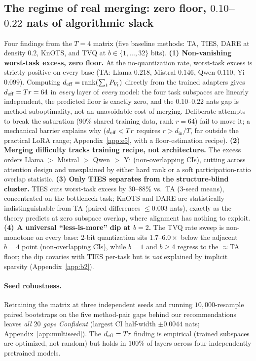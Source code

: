 \subsection{The regime of real merging: zero floor, $0.10$--$0.22$ nats
of algorithmic slack}
\label{subsec:exp-lora}\label{subsec:exp-multiseed}

Four findings from the $T = 4$ matrix (five baseline methods: TA, TIES,
DARE at density $0.2$, KnOTS, and TVQ at $b \in \{1,\dots,32\}$ bits).
\textbf{(1) Non-vanishing worst-task excess, zero floor.} At the
no-quantization rate, worst-task excess is strictly positive on every
base (TA: Llama $0.218$, Mistral $0.146$, Qwen $0.110$, Yi $0.099$).
Computing $d_{\mathrm{eff}} = \operatorname{rank}(\sum_t P_{V_t})$
directly from the trained adapters gives $d_{\mathrm{eff}} = Tr = 64$ in
\emph{every} layer of \emph{every} model: the four task subspaces are
linearly independent, the predicted floor is exactly zero, and the
$0.10$--$0.22$ nats gap is method suboptimality, not an unavoidable
cost of merging. Deliberate attempts to break the saturation ($90\%$
shared training data, rank $r = 64$) fail to move it; a mechanical
barrier explains why ($d_{\mathrm{eff}} < Tr$ requires $r > d_{\mathrm{in}}/T$,
far outside the practical LoRA range; Appendix~\ref{app:e5}, with a
floor-estimation recipe). \textbf{(2) Merging difficulty tracks
training recipe, not architecture.} The excess orders Llama $>$
Mistral $>$ Qwen $>$ Yi (non-overlapping CIs), cutting across
attention design and unexplained by either hard rank or a soft
participation-ratio overlap statistic. \textbf{(3) Only TIES
separates from the structure-blind cluster.} TIES cuts worst-task
excess by $30$--$88\%$ vs.\ TA ($3$-seed means), concentrated on the
bottleneck task; KnOTS and DARE are statistically indistinguishable
from TA (paired differences $\leq 0.003$ nats), exactly as the
theory predicts at zero subspace overlap, where alignment has nothing
to exploit. \textbf{(4) A universal ``less-is-more'' dip at $b=2$.}
The TVQ rate sweep is non-monotone on every base: $2$-bit quantization
sits $1.7$--$6.0\times$ below the adjacent $b = 4$ point
(non-overlapping CIs), while $b = 1$ and $b \geq 4$ regress to the
$\approx$TA floor; the dip covaries with TIES per-task but is
\emph{not} explained by implicit sparsity (Appendix~\ref{app:b2}).

\paragraph{Seed robustness.} Retraining the matrix at three
independent seeds and running $10{,}000$-resample paired bootstraps on
the five method-pair gaps behind our recommendations leaves \emph{all
$20$ gaps Confident} (largest CI half-width $\pm 0.0044$ nats;
Appendix~\ref{app:multiseed}). The $d_{\mathrm{eff}} = Tr$ finding is empirical
(trained subspaces are optimized, not random) but holds in
$100\%$ of layers across four independently pretrained models.

